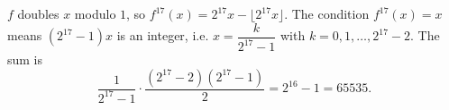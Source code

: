 $f$ doubles $x$ modulo $1$, so $f^{17}(x)=2^{17}x-\lfloor2^{17}x\rfloor$. The condition $f^{17}(x)=x$ means $(2^{17}-1)x$ is an integer, i.e. $x=\dfrac {k}{2^{17}-1}$ with $k=0,1,\dots,2^{17}-2$. The sum is
\[\dfrac{1}{2^{17}-1}\cdot\dfrac{(2^{17}-2)(2^{17}-1)}{2}=2^{16}-1=\boxed{65535}.\]
